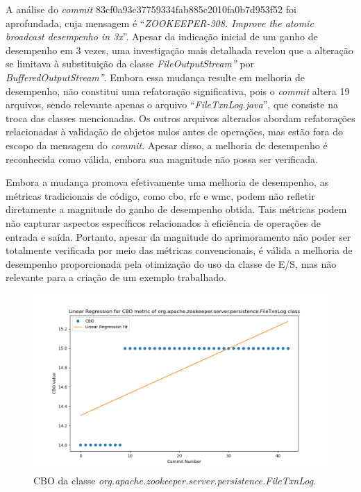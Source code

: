 A análise do \textit{commit} 83cf0a93c37759334fab885c2010fa0b7d953f52 foi aprofundada, cuja mensagem é ``\textit{ZOOKEEPER-308. Improve the atomic broadcast desempenho in 3x}''. Apesar da indicação inicial de um ganho de desempenho em 3 vezes, uma investigação mais detalhada revelou que a alteração se limitava à substituição da classe \textit{FileOutputStream''} por \textit{BufferedOutputStream''}. Embora essa mudança resulte em melhoria de desempenho, não constitui uma refatoração significativa, pois o \textit{commit} altera 19 arquivos, sendo relevante apenas o arquivo ``\textit{FileTxnLog.java}'', que consiste na troca das classes mencionadas. Os outros arquivos alterados abordam refatorações relacionadas à validação de objetos nulos antes de operações, mas estão fora do escopo da mensagem do \textit{commit}. Apesar disso, a melhoria de desempenho é reconhecida como válida, embora sua magnitude não possa ser verificada.

Embora a mudança promova efetivamente uma melhoria de desempenho, as métricas tradicionais de código, como \gls{cbo}, \gls{rfc} e \gls{wmc}, podem não refletir diretamente a magnitude do ganho de desempenho obtida. Tais métricas podem não capturar aspectos específicos relacionados à eficiência de operações de entrada e saída. Portanto, apesar da magnitude do aprimoramento não poder ser totalmente verificada por meio das métricas convencionais, é válida a melhoria de desempenho proporcionada pela otimização do uso da classe de E/S, mas não relevante para a criação de um exemplo trabalhado.

\begin{figure}[h]
    \centering
    \includegraphics[width=0.8\linewidth]{figuras/343-83cf0a93c37759334fab885c2010fa0b7d953f52/Class-org.apache.zookeeper.server.persistence.FileTxnLog/CBO.png}
    \caption{CBO da classe \textit{org.apache.zookeeper.server.persistence.FileTxnLog}.}
    \label{fig:CBO3xPerformanceClass}
\end{figure}

